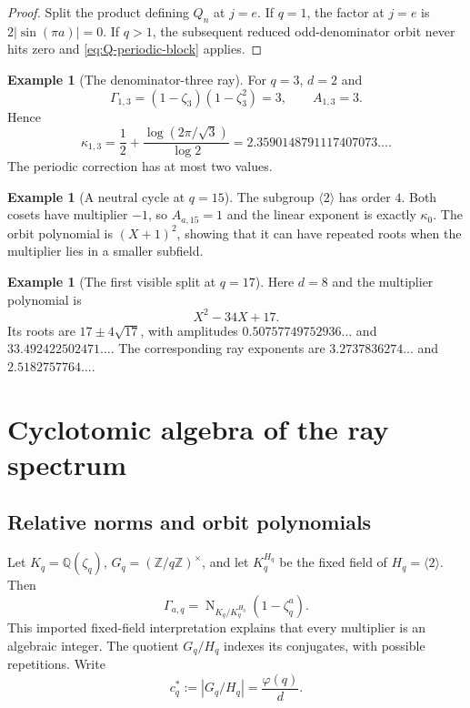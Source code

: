 \documentclass[11pt,oneside]{article}
\theoremstyle{definition}
\newtheorem{example}[theorem]{Example}
\theoremstyle{remark}
\newcommand{\Q}{\mathbb Q}
\newcommand{\Z}{\mathbb Z}
\newcommand{\Norm}{\operatorname{N}}
\begin{document}
\begin{proof}
Split the product defining $Q_n$ at $j=e$. If $q=1$, the factor at $j=e$ is
$2|\sin(\pi a)|=0$. If $q>1$, the subsequent reduced odd-denominator orbit never
hits zero and \eqref{eq:Q-periodic-block} applies.
\end{proof}

\begin{example}[The denominator-three ray]
For $q=3$, $d=2$ and
\[
 \Gamma_{1,3}=(1-\zeta_3)(1-\zeta_3^2)=3,
 \qquad A_{1,3}=3.
\]
Hence
\[
 \kappa_{1,3}=\frac12+\frac{\log(2\pi/\sqrt3)}{\log2}
 =2.3590148791117407073\ldots.
\]
The periodic correction has at most two values.
\end{example}

\begin{example}[A neutral cycle at $q=15$]
The subgroup $\langle2\rangle$ has order $4$. Both cosets have multiplier $-1$,
so $A_{a,15}=1$ and the linear exponent is exactly $\kappa_0$. The orbit polynomial
is $(X+1)^2$, showing that it can have repeated roots when the multiplier lies in
a smaller subfield.
\end{example}

\begin{example}[The first visible split at $q=17$]
Here $d=8$ and the multiplier polynomial is
\[
 X^2-34X+17.
\]
Its roots are $17\pm4\sqrt{17}$, with amplitudes
$0.50757749752936\ldots$ and $33.492422502471\ldots$. The corresponding ray
exponents are $3.2737836274\ldots$ and $2.5182757764\ldots$.
\end{example}

\section{Cyclotomic algebra of the ray spectrum}\label{sec:cyclotomic-algebra}

\subsection{Relative norms and orbit polynomials}

Let $K_q=\Q(\zeta_q)$, $G_q=(\Z/q\Z)^\times$, and let $K_q^{H_q}$ be the fixed
field of $H_q=\langle2\rangle$. Then
\begin{equation}
 \Gamma_{a,q}=\Norm_{K_q/K_q^{H_q}}(1-\zeta_q^a).
 \label{eq:relative-norm}
\end{equation}
This imported fixed-field interpretation explains that every multiplier is an
algebraic integer. The quotient $G_q/H_q$ indexes its conjugates, with possible
repetitions. Write
\begin{equation}
 c_q^*:=|G_q/H_q|=\frac{\varphi(q)}d.
 \label{eq:coset-count}
\end{equation}
\end{document}
